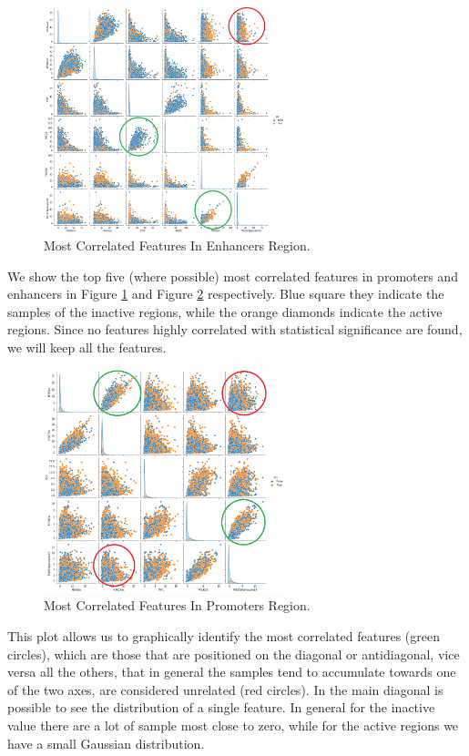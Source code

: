 \documentclass{article}
\begin{document}
\begin{figure}[!ht]
    \centering
    \includegraphics[width=7cm]{image/Features_Correlation_Enhancers_Box.PNG}
    \caption{Most Correlated Features In Enhancers Region.}
    \label{fig:Features_Correlation_Enhancers}
\end{figure}

\noindent
We show the top five (where possible) most correlated features in promoters and enhancers in Figure \ref{fig:Features_Correlation_Enhancers} and Figure \ref{fig:Features_Correlation_Promoters} respectively. Blue square they indicate the samples of the inactive regions, while the orange diamonds indicate the active regions. Since no features highly correlated with statistical significance are found, we will keep all the features.

\begin{figure}[!ht]
    \centering
    \includegraphics[width=7cm]{image/Features_Correlation_Promoters_Box.PNG}
    \caption{Most Correlated Features In Promoters Region.}
    \label{fig:Features_Correlation_Promoters}
\end{figure}

\noindent
This plot allows us to graphically identify the most correlated features (green circles), which are those that are positioned on the diagonal or antidiagonal, vice versa all the others, that in general the samples tend to accumulate towards one of the two axes, are considered unrelated (red circles). In the main diagonal is possible to see the distribution of a single feature. In general for the inactive value there are a lot of sample most close to zero, while for the active regions we have a small Gaussian distribution.
\end{document}
